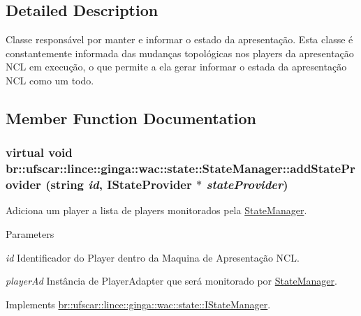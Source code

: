 \subsection{Detailed Description}
Classe responsável por manter e informar o estado da apresentação. Esta classe é constantemente informada das mudanças topológicas nos players da apresentação NCL em execução, o que permite a ela gerar informar o estada da apresentação NCL como um todo. 

\subsection{Member Function Documentation}
\hypertarget{classbr_1_1ufscar_1_1lince_1_1ginga_1_1wac_1_1state_1_1StateManager_aa02a5c2cc3e5933a60225dc1b67e75e8}{
\subsubsection[{addStateProvider}]{\setlength{\rightskip}{0pt plus 5cm}virtual void br::ufscar::lince::ginga::wac::state::StateManager::addStateProvider (string {\em id}, \/  {\bf IStateProvider} $\ast$ {\em stateProvider})}}
\label{classbr_1_1ufscar_1_1lince_1_1ginga_1_1wac_1_1state_1_1StateManager_aa02a5c2cc3e5933a60225dc1b67e75e8}


Adiciona um player a lista de players monitorados pela \hyperlink{classbr_1_1ufscar_1_1lince_1_1ginga_1_1wac_1_1state_1_1StateManager}{StateManager}. 


\begin{DoxyParams}{Parameters}
\item[{\em id}]Identificador do Player dentro da Maquina de Apresentação NCL. \item[{\em playerAd}]Instância de PlayerAdapter que será monitorado por \hyperlink{classbr_1_1ufscar_1_1lince_1_1ginga_1_1wac_1_1state_1_1StateManager}{StateManager}. \end{DoxyParams}


Implements \hyperlink{classbr_1_1ufscar_1_1lince_1_1ginga_1_1wac_1_1state_1_1IStateManager_a739db8ceb6f56a110aa46bd272ea0956}{br::ufscar::lince::ginga::wac::state::IStateManager}.

